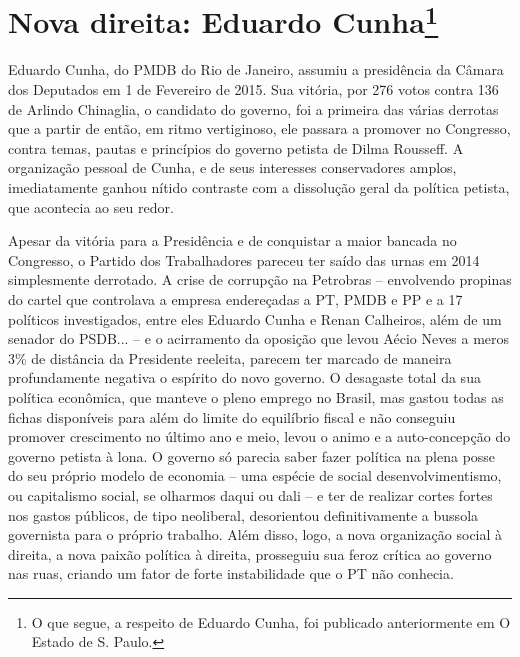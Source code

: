   \section[Nova direita: Eduardo Cunha]{Nova direita: Eduardo
  Cunha\protect\footnote{O que segue, a respeito de Eduardo Cunha, foi publicado
    anteriormente em O Estado de S. Paulo.}}\label{nova-direita-eduardo-cunha}

Eduardo Cunha, do PMDB do Rio de Janeiro, assumiu a presidência da
Câmara dos Deputados em 1 de Fevereiro de 2015. Sua vitória, por 276
votos contra 136 de Arlindo Chinaglia, o candidato do governo, foi a
primeira das várias derrotas que a partir de então, em ritmo
vertiginoso, ele passara a promover no Congresso, contra temas, pautas e
princípios do governo petista de Dilma Rousseff. A organização pessoal
de Cunha, e de seus interesses conservadores amplos, imediatamente
ganhou nítido contraste com a dissolução geral da política petista, que
acontecia ao seu redor.

Apesar da vitória para a Presidência e de conquistar a maior bancada no
Congresso, o Partido dos Trabalhadores pareceu ter saído das urnas em
2014 simplesmente derrotado. A crise de corrupção na Petrobras --
envolvendo propinas do cartel que controlava a empresa endereçadas a PT,
PMDB e PP e a 17 políticos investigados, entre eles Eduardo Cunha e
Renan Calheiros, além de um senador do PSDB... -- e o acirramento da
oposição que levou Aécio Neves a meros 3\% de distância da Presidente
reeleita, parecem ter marcado de maneira profundamente negativa o
espírito do novo governo. O desagaste total da sua política econômica,
que manteve o pleno emprego no Brasil, mas gastou todas as fichas
disponíveis para além do limite do equilíbrio fiscal e não conseguiu
promover crescimento no último ano e meio, levou o animo e a
auto-concepção do governo petista à lona. O governo só parecia saber
fazer política na plena posse do seu próprio modelo de economia -- uma
espécie de social desenvolvimentismo, ou capitalismo social, se olharmos
daqui ou dali -- e ter de realizar cortes fortes nos gastos públicos, de
tipo neoliberal, desorientou definitivamente a bussola governista para o
próprio trabalho. Além disso, logo, a nova organização social à direita,
a nova paixão política à direita, prosseguiu sua feroz crítica ao
governo nas ruas, criando um fator de forte instabilidade que o PT não
conhecia.

